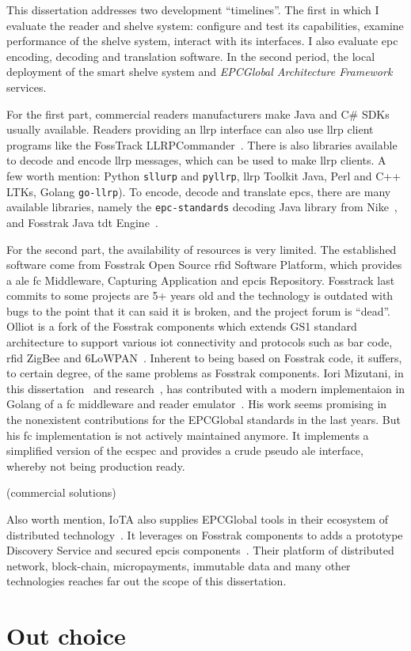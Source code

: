 This dissertation addresses two development ``timelines''. The first in which I evaluate the reader and shelve system: configure and test its capabilities, examine performance of the shelve system, interact with its interfaces. I also evaluate \ac{epc} encoding, decoding and translation software.
In the second period, the local deployment of the smart shelve system and \emph{EPCGlobal Architecture Framework} services.

For the first part, commercial readers manufacturers make Java and C# SDKs usually available. Readers providing an \ac{llrp} interface can also use \ac{llrp} client programs like the FossTrack LLRPCommander~\cite{FosstrakLLRPCommander}. There is also libraries available to decode and encode \ac{llrp} messages, which can be used to make \ac{llrp} clients. A few worth mention: Python \texttt{sllurp} and \texttt{pyllrp}, \ac{llrp} Toolkit Java, Perl and C++ LTKs\cite{LlrpOrga}, Golang \texttt{go-llrp}).
To encode, decode and translate \acp{epc}, there are many available libraries, namely the \texttt{epc-standards} decoding Java library from Nike~\cite{NikeIncEpcstandards2019}, and Fosstrak Java \ac{tdt} Engine~\cite{FosstrakTagData}.

For the second part, the availability of resources is very limited.
The established software come from Fosstrak Open Source \ac{rfid} Software Platform, which provides a \ac{ale} \ac{fc} Middleware, Capturing Application and \ac{epcis} Repository. Fosstrack last commits to some projects are 5+ years old and the technology is outdated with bugs to the point that it can said it is broken, and the project forum is ``dead''.
Olliot is a fork of the Fosstrak components which extends GS1 standard architecture to support various \ac{iot} connectivity and protocols such as bar code, \ac{rfid} ZigBee and 6LoWPAN~\cite{OpenLanguageInternet}. Inherent to being based on Fosstrak code, it suffers, to certain degree, of the same problems as Fosstrak components.
Iori Mizutani, in this dissertation~\cite{mizutaniRobustHighPerformance} and research~\cite{mizutaniMulticodePortableRFID2016b}, has contributed with a modern implementaion in Golang of a \ac{fc} middleware and reader emulator~\cite{mizutaniIomzGolemu2020, mizutaniIomzGosstrak2020}. His work seems promising in the nonexistent contributions for the EPCGlobal standards in the last years. But his \ac{fc} implementation is not actively maintained anymore. It implements a simplified version of the \ac{ecspec} and provides a crude pseudo \ac{ale} interface, whereby not being production ready.

(commercial solutions)

Also worth mention, IoTA also supplies EPCGlobal tools in their ecosystem of distributed technology~\cite{GlobalTradeSupply}. It leverages on Fosstrak components to adds a prototype Discovery Service and secured \ac{epcis} components~\cite{FosstrakSimilarProjects}. Their platform of distributed network, block-chain, micropayments, immutable data and many other technologies reaches far out the scope of this dissertation.

\section{Out choice} \label{sec:ourchoice}
